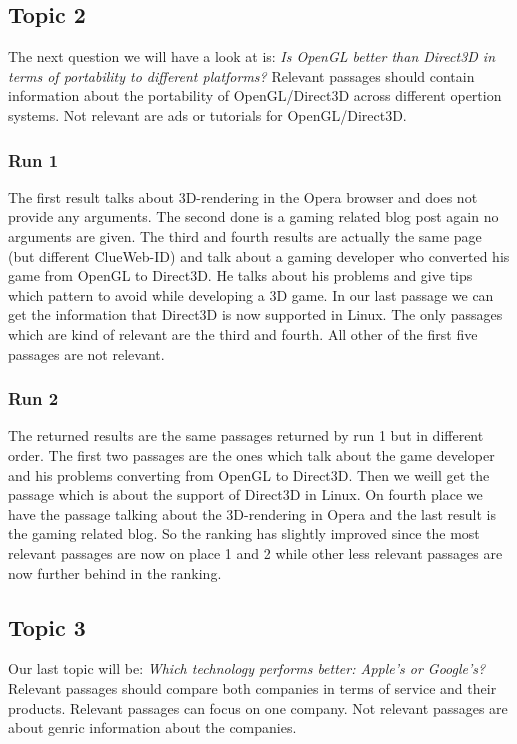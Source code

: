     \subsection{Topic 2}
        The next question we will have a look at is: \textit{Is OpenGL better than Direct3D in terms of portability to different platforms?} Relevant passages should contain information about the portability of OpenGL/Direct3D across different opertion systems. Not relevant are ads or tutorials for OpenGL/Direct3D.
        \subsubsection*{Run 1}
            The first result talks about 3D-rendering in the Opera browser and does not provide any arguments. The second done is a gaming related blog post again no arguments are given. The third and fourth results are actually the same page (but different ClueWeb-ID) and talk about a gaming developer who converted his game from OpenGL to Direct3D. He talks about his problems and give tips which pattern to avoid while developing a 3D game. In our last passage we can get the information that Direct3D is now supported in Linux. The only passages which are kind of relevant are the third and fourth. All other of the first five passages are not relevant. 
        \subsubsection*{Run 2}
            The returned results are the same passages returned by run 1 but in different order. The first two passages are the ones which talk about the game developer and his problems converting from OpenGL to Direct3D. Then we weill get the passage which is about the support of Direct3D in Linux. On fourth place we have the passage talking about the 3D-rendering in Opera and the last result is the gaming related blog. So the ranking has slightly improved since the most relevant passages are now on place 1 and 2 while other less relevant passages are now further behind in the ranking.
    \subsection{Topic 3}
        Our last topic will be: \textit{Which technology performs better: Apple's or Google's?} Relevant passages should compare both companies in terms of service and their products. Relevant passages can focus on one company. Not relevant passages are about genric information about the companies.
